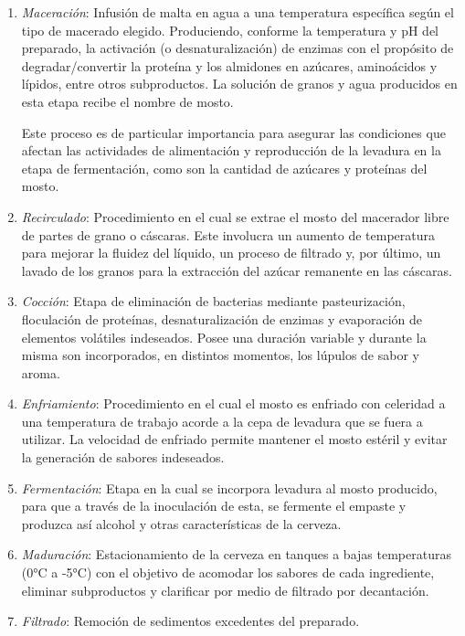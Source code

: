         \begin{enumerate}
            \item \textit{Maceración}: Infusión de malta en agua a una temperatura específica según el tipo de macerado elegido. Produciendo, conforme la temperatura y pH del preparado, la activación (o desnaturalización) de enzimas con el propósito de degradar/convertir la proteína y los almidones en azúcares, aminoácidos y lípidos, entre otros subproductos. La solución de granos y agua producidos en esta etapa recibe el nombre de mosto.
            
            \par Este proceso es de particular importancia para asegurar las condiciones que afectan las actividades de alimentación y reproducción de la levadura en la etapa de fermentación, como son la cantidad de azúcares y proteínas del mosto.
            
            \item \textit{Recirculado}: Procedimiento en el cual se extrae el mosto del macerador libre de partes de grano o cáscaras. Este involucra un aumento de temperatura para mejorar la fluidez del líquido, un proceso de filtrado y, por último, un lavado de los granos para la extracción del azúcar remanente en las cáscaras.
            
            \item \textit{Cocción}: Etapa de eliminación de bacterias mediante pasteurización, floculación de proteínas, desnaturalización de enzimas y evaporación de elementos volátiles indeseados. Posee una duración variable y durante la misma son incorporados, en distintos momentos, los lúpulos de sabor y aroma.

            \item \textit{Enfriamiento}: Procedimiento en el cual el mosto es enfriado con celeridad a una temperatura de trabajo acorde a la cepa de levadura que se fuera a utilizar. La velocidad de enfriado permite mantener el mosto estéril y evitar la generación de sabores indeseados.

            \item \textit{Fermentación}: Etapa en la cual se incorpora levadura al mosto producido, para que a través de la inoculación de esta, se fermente el empaste y produzca así alcohol y otras características de la cerveza. 

            \item \textit{Maduración}: Estacionamiento de la cerveza en tanques a bajas temperaturas (0°C a -5°C) con el objetivo de acomodar los sabores de cada ingrediente, eliminar subproductos y clarificar por medio de filtrado por decantación.

            \item \textit{Filtrado}: Remoción de sedimentos excedentes del preparado. 
        \end{enumerate}
        
